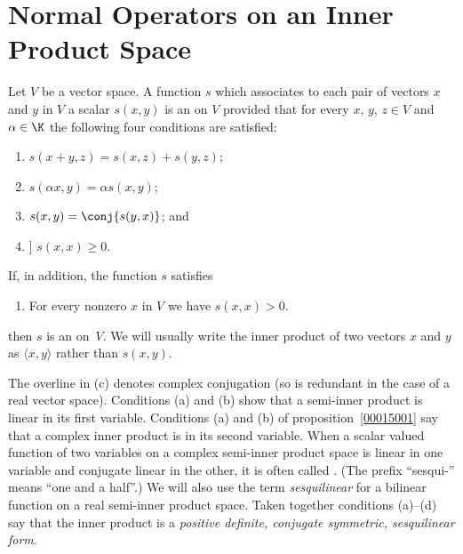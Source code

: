 \section{Normal Operators on an Inner Product Space}
\begin{defn} Let $V$ be a vector space.  A function $s$ which associates to each pair of vectors
$x$ and $y$ in $V$ a scalar
$s(x,y)$ is an
 on $V$ provided that for every $x$, $y$, $z \in V$ and $\alpha \in \K$ the following four conditions are satisfied:
 \begin{enumerate}
   \item $s(x + y , z) = s(x,z) + s(y,z)$;
   \item $s(\alpha x,y) = \alpha s(x,y)$;
   \item $s(x,y) = \conj{s(y,x)}$; and
   \item] $s(x,x) \ge 0$.
 \end{enumerate}
 If, in addition, the function $s$ satisfies
  \begin{enumerate}
    \item For every nonzero $x$ in $V$ we have $s(x,x) > 0$.
  \end{enumerate}
then $s$ is an
 on~$V$.  We will usually write the inner product of two vectors $x$ and $y$ as
$\langle x,y \rangle$ rather than $s(x,y)$.

\noindent The overline in (c) denotes complex conjugation (so is redundant in the case of a real vector space).
Conditions (a) and (b) show that a semi-inner product is linear in its first variable.  Conditions (a) and (b) of
proposition~\ref{00015001} say that a complex inner product is
 in its second variable.  When a scalar valued function of two variables on a complex semi-inner product
space is linear in one variable and conjugate linear in the other, it is often called
.  (The prefix ``sesqui-'' means ``one and a half''.)  We will also use the term \emph{sesquilinear} for a
bilinear function on a real semi-inner product space.  Taken together conditions (a)--(d) say that the inner product is a
\emph{positive definite, conjugate symmetric, sesquilinear form}.
\end{defn}

